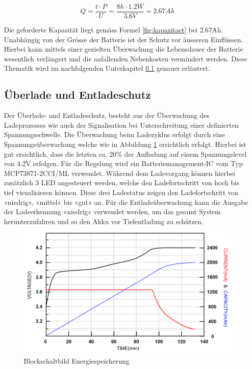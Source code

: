 \begin{equation}
Q=\frac{t\cdot P}{U}=\frac{8h\cdot 1.2W}{3.6V}=2.67Ah
\label{fig:kapazitaet}
\end{equation}

Die geforderte Kapazität liegt gemäss Formel \ref{fig:kapazitaet} bei 2.67Ah. Unabhängig von der Grösse der Batterie ist der Schutz vor äusseren Einflüssen. Hierbei kann mittels einer gezielten Überwachung die Lebensdauer der Batterie wesentlich verlängert und die anfallenden Nebenkosten vermindert werden. Diese Thematik wird im nachfolgenden Unterkapitel \ref{Überlade und Entladeschutz} genauer erläutert.
                                         
\subsection{Überlade und Entladeschutz}  \label{Überlade und Entladeschutz}

Der Überlade- und Entladeschutz, besteht aus der Überwachung des Ladeprozesses wie auch der Signalisation bei Unterschreitung einer definierten Spannungsschwelle. Die Überwachung beim Ladezyklus erfolgt durch eine Spannungsüberwachung welche wie in Abbildung \ref{fig:Ladekurve Li-Ion Akku} ersichtlich erfolgt. Hierbei ist gut ersichtlich, dass die letzten ca. 20\% der Aufladung auf einem Spannungslevel von 4.2V erfolgen. Für die Regelung wird ein Batteriemanagement-IC vom Typ MCP73871-2CCI/ML verwendet.
Während dem Ladevorgang können hierbei zusätzlich 3 LED angesteuert werden, welche den Ladefortschritt von hoch bis tief visualisieren können. Diese drei Ladestatus zeigen den Ladefortschritt von «niedrig», «mittel» bis «gut» an. Für die Entladeüberwachung kann die Ausgabe der Ladeerkennung «niedrig» verwendet werden, um das gesamt System herunterzufahren und so den Akku vor Tiefentladung zu schützen.

\begin{figure}[H]
	\begin{center}
		\includegraphics[width=120mm]{data/LadekurveLiIon.png}
		\caption{Blockschaltbild Energiespeicherung} %
		\label{fig:Ladekurve Li-Ion Akku}
	\end{center}
\end{figure}
